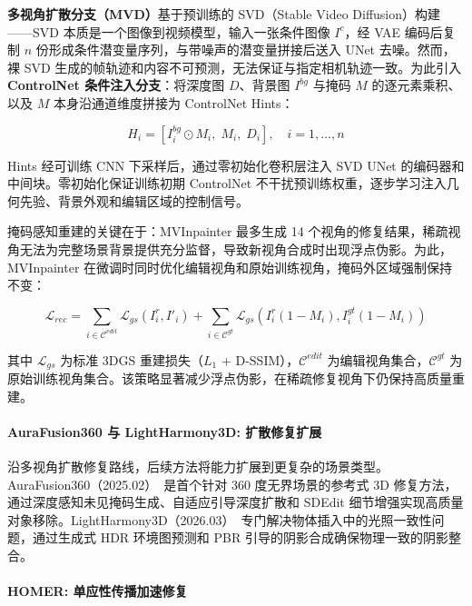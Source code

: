 \textbf{多视角扩散分支（MVD）}基于预训练的 SVD（Stable Video Diffusion）构建——SVD 本质是一个图像到视频模型，输入一张条件图像 $I^c$，经 VAE 编码后复制 $n$ 份形成条件潜变量序列，与带噪声的潜变量拼接后送入 UNet 去噪。然而，裸 SVD 生成的帧轨迹和内容不可预测，无法保证与指定相机轨迹一致。为此引入\textbf{ControlNet 条件注入分支}：将深度图 $D$、背景图 $I^{bg}$ 与掩码 $M$ 的逐元素乘积、以及 $M$ 本身沿通道维度拼接为 ControlNet Hints：

\begin{equation}
H_i = [I^{bg}_i \odot M_i,\; M_i,\; D_i], \quad i = 1, \ldots, n
\end{equation}

Hints 经可训练 CNN 下采样后，通过零初始化卷积层注入 SVD UNet 的编码器和中间块。零初始化保证训练初期 ControlNet 不干扰预训练权重，逐步学习注入几何先验、背景外观和编辑区域的控制信号。

掩码感知重建的关键在于：MVInpainter 最多生成 14 个视角的修复结果，稀疏视角无法为完整场景背景提供充分监督，导致新视角合成时出现浮点伪影。为此，MVInpainter 在微调时同时优化编辑视角和原始训练视角，掩码外区域强制保持不变：

\begin{equation}
\mathcal{L}_{rec} = \sum_{i \in \mathcal{C}^{edit}} \mathcal{L}_{gs}(I^r_i, I'_i) + \sum_{i \in \mathcal{C}^{gt}} \mathcal{L}_{gs}(I^r_i (1-M_i), I^{gt}_i (1-M_i))
\end{equation}

其中 $\mathcal{L}_{gs}$ 为标准 3DGS 重建损失（$L_1$ + D-SSIM），$\mathcal{C}^{edit}$ 为编辑视角集合，$\mathcal{C}^{gt}$ 为原始训练视角集合。该策略显著减少浮点伪影，在稀疏修复视角下仍保持高质量重建。

\paragraph{AuraFusion360 与 LightHarmony3D: 扩散修复扩展}

沿多视角扩散修复路线，后续方法将能力扩展到更复杂的场景类型。AuraFusion360（2025.02）~\cite{2502_05176}是首个针对 360 度无界场景的参考式 3D 修复方法，通过深度感知未见掩码生成、自适应引导深度扩散和 SDEdit 细节增强实现高质量对象移除。LightHarmony3D（2026.03）~\cite{2603_29209}专门解决物体插入中的光照一致性问题，通过生成式 HDR 环境图预测和 PBR 引导的阴影合成确保物理一致的阴影整合。

\paragraph{HOMER: 单应性传播加速修复}

